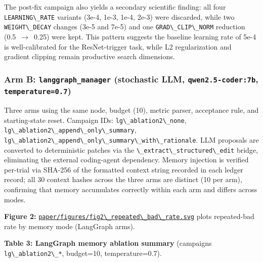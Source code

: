 The post-fix campaign also yields a secondary scientific finding: all four \passthrough{\lstinline!LEARNING\_RATE!} variants (3e-4, 1e-3, 1e-4, 2e-3) were discarded, while two \passthrough{\lstinline!WEIGHT\_DECAY!} changes (3e-5 and 7e-5) and one \passthrough{\lstinline!GRAD\_CLIP\_NORM!} reduction (0.5~$\to$~0.25) were kept. This pattern suggests the baseline learning rate of 5e-4 is well-calibrated for the ResNet-trigger task, while L2 regularization and gradient clipping remain productive search dimensions.

\subsubsection{\texorpdfstring{Arm B: \texttt{langgraph\_manager} (stochastic LLM, \texttt{qwen2.5-coder:7b}, \texttt{temperature=0.7})}{Arm B: langgraph\_manager (stochastic LLM, qwen2.5-coder:7b, temperature=0.7)}}\label{arm-b-langgraph_manager-stochastic-llm-qwen2.5-coder7b-temperature0.7}

Three arms using the same node, budget (10), metric parser, acceptance rule, and starting-state reset. Campaign IDs: \passthrough{\lstinline!lg\_ablation2\_none!}, \passthrough{\lstinline!lg\_ablation2\_append\_only\_summary!}, \passthrough{\lstinline!lg\_ablation2\_append\_only\_summary\_with\_rationale!}. LLM proposals are converted to deterministic patches via the \passthrough{\lstinline!\_extract\_structured\_edit!} bridge, eliminating the external coding-agent dependency. Memory injection is verified per-trial via SHA-256 of the formatted context string recorded in each ledger record; all 30 context hashes across the three arms are distinct (10 per arm), confirming that memory accumulates correctly within each arm and differs across modes.

\textbf{Figure 2:} \href{../../figures/fig2_repeated_bad_rate.svg}{\passthrough{\lstinline!paper/figures/fig2\_repeated\_bad\_rate.svg!}} plots repeated-bad rate by memory mode (LangGraph arms).

\textbf{Table 3: LangGraph memory ablation summary} (campaigns \passthrough{\lstinline!lg\_ablation2\_*!}, budget=10, temperature=0.7).

